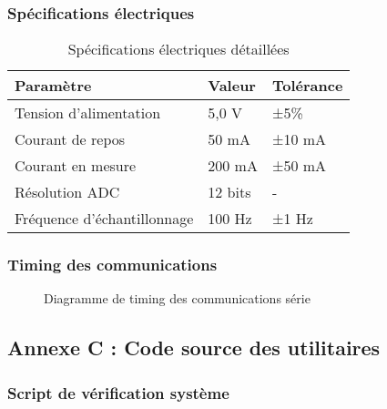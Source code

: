 \documentclass[12pt,a4paper]{article}
\begin{document}
\subsubsection{Spécifications électriques}

\begin{table}[H]
\centering
\begin{tabular}{|l|l|l|}
\hline
\textbf{Paramètre} & \textbf{Valeur} & \textbf{Tolérance} \\
\hline
Tension d'alimentation & 5,0 V & ±5\% \\
\hline
Courant de repos & 50 mA & ±10 mA \\
\hline
Courant en mesure & 200 mA & ±50 mA \\
\hline
Résolution ADC & 12 bits & - \\
\hline
Fréquence d'échantillonnage & 100 Hz & ±1 Hz \\
\hline
\end{tabular}
\caption{Spécifications électriques détaillées}
\label{tab:electrical_specs}
\end{table}

\subsubsection{Timing des communications}

\begin{figure}[H]
\centering
{}
\caption{Diagramme de timing des communications série}
\label{fig:timing}
\end{figure}

\subsection{Annexe C : Code source des utilitaires}

\subsubsection{Script de vérification système}
\end{document}
